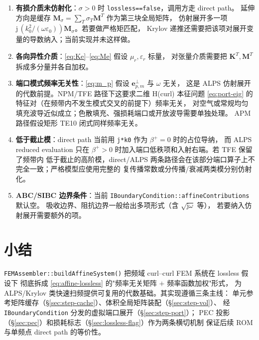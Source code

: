\documentclass[UTF8,a4paper,11pt]{ctexart}
\newcommand{\jj}{\mathrm{j}}
\newcommand{\code}[1]{\texttt{\small #1}}
\begin{document}
\begin{enumerate}[leftmargin=2em]
\item \textbf{有损介质未仿射化}：$\sigma>0$ 时 \code{lossless==false}，调用方走 direct path。
延伸方向是缓存 $\bm M_\sigma=\sum_T\sigma_T\bm M^T$ 作为第三块全局矩阵，
仿射展开多一项 $\jj\,(k_0^{2}/(\omega\varepsilon_0))\bm M_\sigma$。若要做严格矩匹配，
Krylov 递推还需要把该项对展开变量的导数纳入；当前实现并未这样做。
\item \textbf{各向异性介质}：\eqref{eq:Ke}--\eqref{eq:Me} 假设 $\mu_r,\varepsilon_r$ 标量，
对张量介质需要把 $\bm K^T,\bm M^T$ 拆成多分量并各自加权。
\item \textbf{端口模式频率无关性}：\eqref{eq:m_p} 假设 $\bm e_{p,m}^{\perp}$ 与 $\omega$ 无关，
这是 ALPS 仿射展开的代数前提。NPM/TFE 路径下这要求二维 H(curl) 本征问题
\eqref{eq:port-eig} 的特征对（在频带内不发生模式交叉的前提下）频率无关，
对空气或常规均匀填充波导近似成立；色散填充、强损耗端口或开放波导需要单独处理。
APM 路径假设矩形 TE10 闭式同样频率无关。
\item \textbf{低于截止模}：direct path 当前用 \code{j*k0} 作为 $\beta^+=0$ 时的占位导纳，
而 ALPS reduced evaluation 只在 $\beta^+>0$ 时加入端口低秩项和入射右端。若 TFE 保留了频带内
低于截止的高阶模，direct/ALPS 两条路径会在该部分端口算子上不完全一致；严格模型应使用完整的
复传播常数或分传播/衰减两类模分别仿射化。
\item \textbf{ABC/SIBC 边界条件}：当前 \code{IBoundaryCondition::affineContributions} 默认空。
吸收边界、阻抗边界一般给出多项形式（含 $\sqrt{\jj\omega}$ 等），
若要纳入仿射展开需要额外的项。
\end{enumerate}

\section{小结}

\code{FEMAssembler::buildAffineSystem()} 把频域 curl--curl FEM 系统在 lossless 假设下
彻底拆成 \eqref{eq:affine-lossless} 的"频率无关矩阵 $+$ 频率函数加权"形式，
为 ALPS/Krylov 类快速扫频提供可复用的代数基础。其实现遵循三条主线：
单元参考矩阵缓存（§\ref{sec:step-cache}）、体积全局矩阵装配（§\ref{sec:step-vol}）、
经 \code{IBoundaryCondition} 分发的虚拟端口展开（§\ref{sec:step-port}）；
PEC 投影（§\ref{sec:pec}）和损耗标志（§\ref{sec:lossless-flag}）作为两条横切机制
保证后续 ROM 与单频点 direct path 的等价性。
\end{document}
